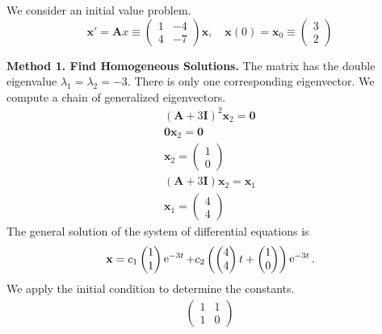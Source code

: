 {\begin{Solution}
  \label{solution x'=(1-44-7)x}
  We consider an initial value problem.
  \[
  \mathbf{x}' = \mathbf{A} x \equiv
  \begin{pmatrix}
    1 & -4 \\
    4 & -7
  \end{pmatrix} 
  \mathbf{x}, \quad 
  \mathbf{x}(0) = \mathbf{x}_0 \equiv
  \begin{pmatrix}
    3 \\
    2
  \end{pmatrix}
  \]


  \textbf{Method 1.  Find Homogeneous Solutions.}
  The matrix has the double eigenvalue $\lambda_1 = \lambda_2 = -3$.
  There is only one corresponding eigenvector.  We compute a chain of 
  generalized eigenvectors.
  \begin{gather*}
    (\mathbf{A} + 3 \mathbf{I})^2 \mathbf{x}_2 = \mathbf{0} \\
    \mathbf{0} \mathbf{x}_2 = \mathbf{0} \\
    \mathbf{x}_2 = 
    \begin{pmatrix} 
      1 \\ 
      0 
    \end{pmatrix} \\
    (\mathbf{A} + 3 \mathbf{I}) \mathbf{x}_2 = \mathbf{x}_1 \\
    \mathbf{x}_1 = 
    \begin{pmatrix} 
      4 \\ 
      4 
    \end{pmatrix}
  \end{gather*}
  The general solution of the system of differential equations is
  \[
  \mathbf{x} = 
  c_1 \begin{pmatrix} 1 \\ 1 \end{pmatrix} \mathop{\mathrm{e}}\nolimits^{-3 t}
  + c_2 \left( \begin{pmatrix} 4 \\ 4 \end{pmatrix} t 
    + \begin{pmatrix} 1 \\ 0 \end{pmatrix} \right) \mathop{\mathrm{e}}\nolimits^{-3 t}.
  \]
  We apply the initial condition to determine the constants.
  \begin{gather*}
    \begin{pmatrix}
      1 & 1 \\
      1 & 0
    \end{pmatrix}

\end{gather*}
\end{Solution}}
